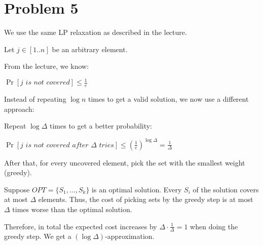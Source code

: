 \section*{Problem 5}

We use the same LP relaxation as described in the lecture. 

Let $j \in [1..n]$ be an arbitrary element.

From the lecture, we know:

$\Pr[j \textit{ is not covered}] \leq \frac{1}{e}$

Instead of repeating $\log n$ times to get a valid solution, we now use a different approach:

Repeat $\log \Delta$ times to get a better probability: 

$
\Pr[j \textit{ is not covered after } \Delta \textit{ tries}] \leq
\left(\frac{1}{e}\right)^{\log \Delta} = 
\frac{1}{\Delta}
$


After that, for every uncovered element, pick the set with the smallest weight (greedy). 

Suppose $OPT = \{S_1,\dots,S_k\}$ is an optimal solution. Every $S_i$ of the solution covers at most $\Delta$ elements. Thus, the cost of picking sets by the greedy step is at most $\Delta$ times worse than the optimal solution.

Therefore, in total the expected cost increases by $\Delta \cdot \frac{1}{\Delta} = 1$ when doing the greedy step. We get a $(\log \Delta)$-approximation.